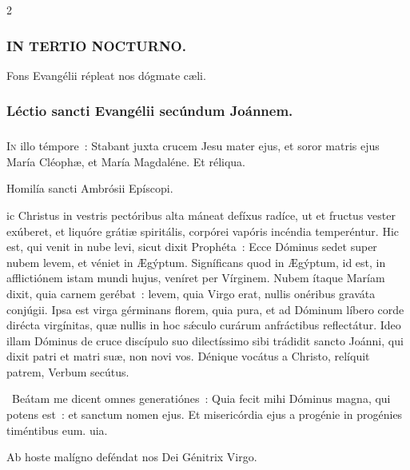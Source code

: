 \documentclass[9pt,twoside]{extarticle}
\begin{document}
\begin{multicols}{2}
\subsubsection*{\center \textsc{IN TERTIO NOCTURNO.}}
\begin{tightlist}{}
\item {\small {} Fons Evangélii répleat nos dógmate cæli.}
\end{tightlist}
\subsubsection*{\center Léctio sancti Evangélii secúndum Joánnem.}
\subsubsection*{\center {}}
\lettrine{I}n illo témpore~: Stabant juxta crucem Jesu mater ejus, et soror matris ejus María Cléophæ, et María Magdaléne. Et réliqua.

\begin{center}Homilía sancti Ambrósii Epíscopi.\\
\end{center}
ic Christus in vestris pectóribus alta máneat defíxus radíce, ut et fructus vester exúberet, et liquóre grátiæ spiritális, corpórei vapóris incéndia temperéntur. Hic est, qui venit in nube levi, sicut dixit Prophéta~: Ecce Dóminus sedet super nubem levem, et véniet in Ægýptum. Signíficans quod in Ægýptum, id est, in afflictiónem istam mundi hujus, veníret per Vírginem. Nubem ítaque Maríam dixit, quia carnem gerébat~: levem, quia Virgo erat, nullis onéribus graváta conjúgii. Ipsa est virga gérminans florem, quia pura, et ad Dóminum líbero corde dirécta virgínitas, quæ nullis in hoc sǽculo curárum anfráctibus reflectátur. Ideo illam Dóminus de cruce discípulo suo dilectíssimo sibi trádidit sancto Joánni, qui dixit patri et matri suæ, non novi vos. Dénique vocátus a Christo, relíquit patrem, Verbum secútus.

\begin{tightlist}{}
\item {}~Beátam me dicent omnes generatiónes~: \textred{*} Quia fecit mihi Dóminus magna, qui potens est~: et sanctum nomen ejus.
 Et misericórdia ejus a progénie in progénies timéntibus eum. uia.
\item {\small {} Ab hoste malígno deféndat nos Dei Génitrix Virgo.}
\end{tightlist}


\end{multicols}
\end{document}

